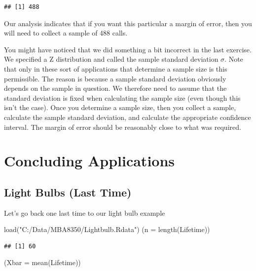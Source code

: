 \documentclass[
]{book}
\newenvironment{Shaded}{\begin{snugshade}}{\end{snugshade}}
\newcommand{\AttributeTok}[1]{\textcolor[rgb]{0.77,0.63,0.00}{#1}}
\newcommand{\FunctionTok}[1]{\textcolor[rgb]{0.00,0.00,0.00}{#1}}
\newcommand{\NormalTok}[1]{#1}
\newcommand{\StringTok}[1]{\textcolor[rgb]{0.31,0.60,0.02}{#1}}
\begin{document}
\begin{verbatim}
## [1] 488
\end{verbatim}

Our analysis indicates that if you want this particular a margin of error, then you will need to collect a sample of 488 calls.

You might have noticed that we did something a bit incorrect in the last exercise. We specified a Z distribution and called the sample standard deviation \(\sigma\). Note that only in these sort of applications that determine a sample size is this permissible. The reason is because a sample standard deviation obviously depends on the sample in question. We therefore need to assume that the standard deviation is fixed when calculating the sample size (even though this isn't the case). Once you determine a sample size, then you collect a sample, calculate the sample standard deviation, and calculate the appropriate confidence interval. The margin of error should be reasonably close to what was required.

\hypertarget{concluding-applications}{%
\section{Concluding Applications}\label{concluding-applications}}

\hypertarget{light-bulbs-last-time}{%
\subsection{Light Bulbs (Last Time)}\label{light-bulbs-last-time}}

Let's go back one last time to our light bulb example

\begin{Shaded}
\begin{Highlighting}[]
\FunctionTok{load}\NormalTok{(}\StringTok{"C:/Data/MBA8350/Lightbulb.Rdata"}\NormalTok{)}
\NormalTok{(}\AttributeTok{n =} \FunctionTok{length}\NormalTok{(Lifetime))}
\end{Highlighting}
\end{Shaded}

\begin{verbatim}
## [1] 60
\end{verbatim}

\begin{Shaded}
\begin{Highlighting}[]
\NormalTok{(}\AttributeTok{Xbar =} \FunctionTok{mean}\NormalTok{(Lifetime))}
\end{Highlighting}
\end{Shaded}
\end{document}
